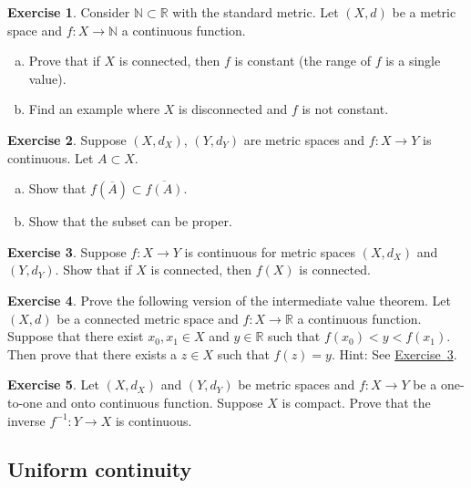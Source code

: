 \documentclass[12pt,openany]{book}
\newcommand{\widebar}[1]{\overline{#1}}
\newcommand{\R}{{\mathbb{R}}}
\newcommand{\N}{{\mathbb{N}}}
\theoremstyle{plain}
\theoremstyle{remark}
\theoremstyle{definition}
\newenvironment{exbox}{%
    \def\FrameCommand{\vrule width 1pt \relax\hspace{10pt}}%
    \MakeFramed{\advance\hsize-\width\FrameRestore}%
}{%
    \endMakeFramed
}
\newenvironment{exparts}{%
    \leavevmode\begin{enumerate}[a),noitemsep,topsep=0pt,parsep=0pt,partopsep=0pt]
}{%
    \end{enumerate}
}
\theoremstyle{exercise}
\newtheorem{exercise}{Exercise}[section]
\theoremstyle{example}
\newcommand{\exerciseref}[1]{\hyperref[#1]{Exercise~\ref*{#1}}}
\begin{document}
\begin{exbox}
\begin{exercise}
Consider $\N \subset \R$ with the standard metric.  Let $(X,d)$ be a
metric space and $f \colon X \to \N$ a continuous function.
\begin{exparts}
\item
Prove that if $X$ is connected,
then $f$ is constant (the range of $f$ is a single value).
\item
Find an example where $X$ is disconnected and $f$ is not constant.
\end{exparts}
\end{exercise}

\begin{exercise} 
Suppose $(X,d_X)$, $(Y,d_Y)$ are metric spaces and
$f \colon X \to Y$ is continuous.
Let $A \subset X$.
\begin{exparts}
\item
Show that $f(\widebar{A}) \subset \overline{f(A)}$.
\item
Show that the subset can be proper.
\end{exparts}
\end{exercise}

\begin{exercise} \label{exercise:msconnconn}
Suppose $f \colon X \to Y$ is continuous for metric spaces $(X,d_X)$
and $(Y,d_Y)$.  Show that if $X$ is connected, then $f(X)$ is connected.
\end{exercise}

\begin{exercise}
Prove the following version of the
intermediate value theorem.  Let $(X,d)$ be a connected
metric space and $f \colon X \to \R$ a continuous function.  Suppose that
there exist $x_0,x_1 \in X$ and $y \in \R$ such that $f(x_0) < y < f(x_1)$.
Then prove that there exists a $z \in X$ such that $f(z) = y$.
Hint: See \exerciseref{exercise:msconnconn}.
\end{exercise}

\begin{exercise}
Let $(X,d_X)$ and $(Y,d_Y)$ be metric spaces and
$f \colon X \to Y$ be a one-to-one and onto continuous function.  Suppose
$X$ is compact.  Prove that the inverse $f^{-1} \colon Y \to X$
is continuous.
\end{exercise}
\end{exbox}

\subsection{Uniform continuity}
\end{document}
